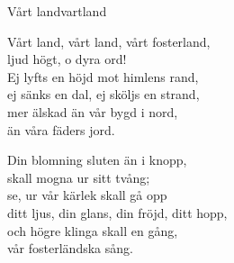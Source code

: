 \begin{song}{Vårt land}{vartland}
\begin{vers}
Vårt land, vårt land, vårt fosterland,\\
ljud högt, o dyra ord!\\
Ej lyfts en höjd mot himlens rand,\\
ej sänks en dal, ej sköljs en strand,\\
mer älskad än vår bygd i nord,\\
än våra fäders jord.\\
\end{vers}
\begin{vers}
Din blomning sluten än i knopp,\\
skall mogna ur sitt tvång;\\
se, ur vår kärlek skall gå opp\\
ditt ljus, din glans, din fröjd, ditt hopp,\\
och högre klinga skall en gång,\\
vår fosterländska sång.\\
\end{vers}
\end{song}
